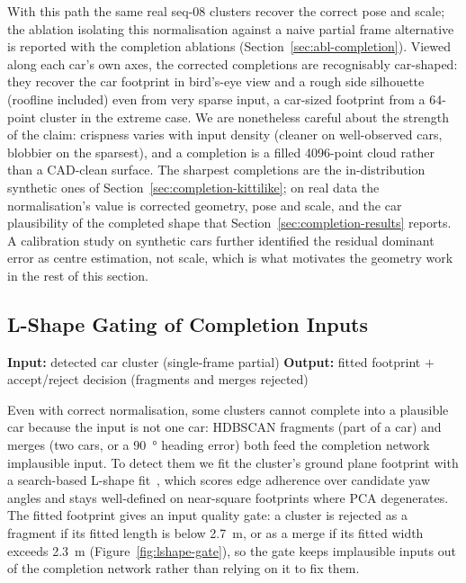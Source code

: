 With this path the same real seq-08 clusters recover the correct pose and scale; the
ablation isolating this normalisation against a naive partial frame alternative is
reported with the completion ablations
(Section~\ref{sec:abl-completion}). Viewed along each
car's own axes, the corrected completions are recognisably car-shaped: they
recover the car footprint in bird's-eye view and a rough side silhouette
(roofline included) even from very sparse input, a car-sized footprint from a
\num{64}-point cluster in the extreme case. We are nonetheless careful about the
strength of the claim: crispness varies with input density (cleaner on
well-observed cars, blobbier on the sparsest), and a completion is a filled
\num{4096}-point cloud rather than a CAD-clean surface. The sharpest completions
are the in-distribution synthetic ones of
Section~\ref{sec:completion-kittilike}; on real data the normalisation's value is
corrected geometry, pose and scale, and the car plausibility of the completed shape
that Section~\ref{sec:completion-results} reports. A calibration study on synthetic cars
further identified the residual dominant error as centre estimation, not scale,
which is what motivates the geometry work in the rest of this section.

\subsection{L-Shape Gating of Completion Inputs}
\label{sec:completion-lshape}

\noindent \textbf{Input:} detected car cluster (single-frame partial) \quad \textbar \quad \textbf{Output:} fitted footprint $+$ accept/reject decision (fragments and merges rejected) \vspace{0.5em}

Even with correct normalisation, some clusters cannot complete into a plausible
car because the input is not one car: HDBSCAN fragments (part of a car) and
merges (two cars, or a \SI{90}{\degree} heading error) both feed the completion
network implausible input. To detect them we fit the cluster's ground plane footprint with a
search-based L-shape fit~\cite{zhang2017lshape}, which scores edge adherence over
candidate yaw angles and stays well-defined on near-square footprints where PCA
degenerates. The fitted footprint gives an input quality gate: a
cluster is rejected as a fragment if its fitted length is below \SI{2.7}{\meter},
or as a merge if its fitted width exceeds \SI{2.3}{\meter}
(Figure~\ref{fig:lshape-gate}), so the gate keeps implausible inputs out of the completion
network rather than relying on it to fix them.


